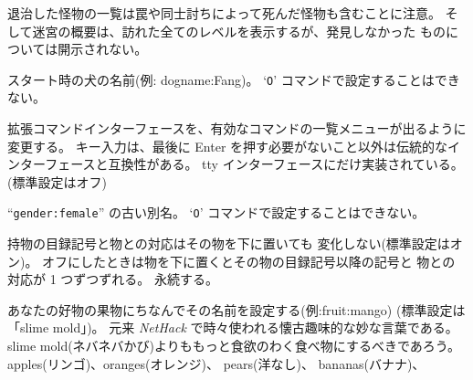 退治した怪物の一覧は罠や同士討ちによって死んだ怪物も含むことに注意。
そして迷宮の概要は、訪れた全てのレベルを表示するが、発見しなかった
ものについては開示されない。
\item[\ib{dogname}]
スタート時の犬の名前(例: dogname:Fang)。
`{\tt O}' コマンドで設定することはできない。
\item[\ib{extmenu}]
拡張コマンドインターフェースを、有効なコマンドの一覧メニューが出るように変更する。
キー入力は、最後に Enter を押す必要がないこと以外は伝統的なインターフェースと互換性がある。
tty インターフェースにだけ実装されている。(標準設定はオフ)
\item[\ib{female}]
``{\tt gender:female}'' の古い別名。
`{\tt O}' コマンドで設定することはできない。
\item[\ib{fixinv}]
持物の目録記号と物との対応はその物を下に置いても
変化しない(標準設定はオン)。
オフにしたときは物を下に置くとその物の目録記号以降の記号と
物との対応が 1 つずつずれる。
永続する。
\item[\ib{fruit}]
あなたの好物の果物にちなんでその名前を設定する(例:fruit:mango)
(標準設定は「slime mold」)。
元来 {\it NetHack\/} で時々使われる懐古趣味的な妙な言葉である。
slime mold(ネバネバかび)よりももっと食欲のわく食べ物にするべきであろう。
apples(リンゴ)、oranges(オレンジ)、 pears(洋なし)、 bananas(バナナ)、
